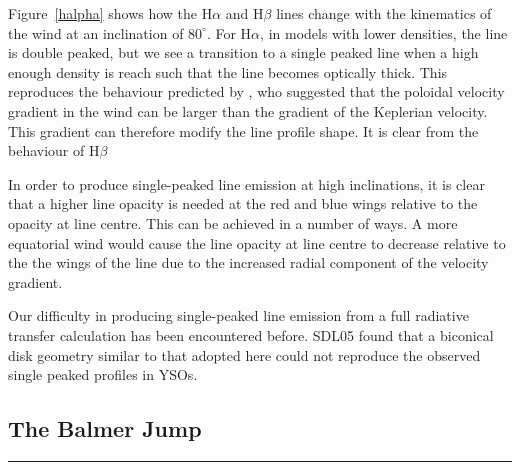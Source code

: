 \documentclass[preprint, a4paper, 11pt]{aastex}
\begin{document}
Figure~\ref{halpha} shows how the H$\alpha$ and H$\beta$ lines change with the kinematics 
of the wind at an inclination of $80^\circ$. For H$\alpha$, in models with lower densities, the
line is double peaked, but we see a transition to a single peaked line when 
a high enough density is reach such that the line becomes optically thick.
This reproduces the behaviour predicted by \cite{MC96}, who suggested that
the poloidal velocity gradient in the wind can be larger than the gradient of 
the Keplerian velocity. This gradient can therefore modify the line profile shape.
It is clear from the behaviour of H$\beta$ 

In order to produce single-peaked line emission at high inclinations,
it is clear that a higher line opacity is needed at the red and blue wings relative to
the opacity at line centre. This can be achieved in a number of ways. A more equatorial 
wind would cause the line opacity at line centre to decrease
relative to the the wings of the line due to the increased radial component 
of the velocity gradient. 

Our difficulty in producing single-peaked line emission from a full 
radiative transfer calculation has been encountered before. SDL05 found that a 
biconical disk geometry similar to that adopted here could not reproduce 
the observed single peaked profiles in YSOs.  



\subsection{The Balmer Jump}

\label{balmerjump}

\noindent\rule{16cm}{0.4pt}
\end{document}
